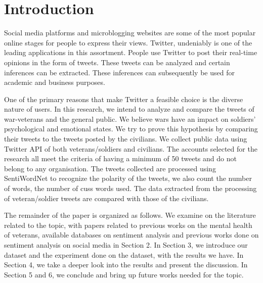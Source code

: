 \section{Introduction}

Social media platforms and microblogging websites are some of the most popular online stages for people to express their views. Twitter, undeniably is one of the leading applications in this assortment. People use Twitter to post their real-time opinions in the form of tweets. These tweets can be analyzed and certain inferences can be extracted. These inferences can subsequently be used for academic and business purposes.

One of the primary reasons that make Twitter a feasible choice is the diverse nature of users. In this research, we intend to analyze and compare the tweets of war-veterans and the general public. We believe wars have an impact on soldiers' psychological and emotional states. We try to prove this hypothesis by comparing their tweets to the tweets posted by the civilians. We collect public data using Twitter API of both veterans/soldiers and civilians. The accounts selected for the research all meet the criteria of having a minimum of 50 tweets and do not belong to any organisation. The tweets collected are processed using SentiWordNet to recognize the polarity of the tweets, we also count the number of words, the number of cuss words used. The data extracted from the processing of veteran/soldier tweets are compared with those of the civilians.

The remainder of the paper is organized as follows. We examine on the literature related to the topic, with papers related to previous works on the mental health of veterans, available databases on sentiment analysis and previous works done on sentiment analysis on social media in Section 2. In Section 3, we introduce our dataset and the experiment done on the dataset, with the results we have. In Section 4, we take a deeper look into the results and present the discussion. In Section 5 and 6, we conclude and bring up future works needed for the topic.
